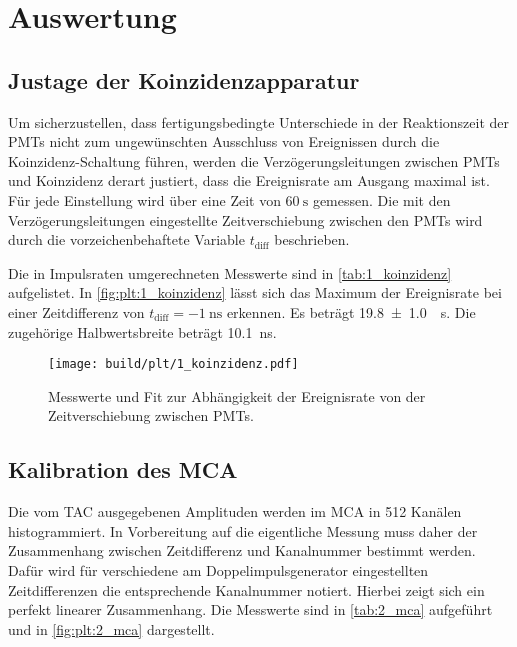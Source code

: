\section{Auswertung}
\label{sec:auswertung}

\FloatBarrier
\subsection{Justage der Koinzidenzapparatur}
Um sicherzustellen,
dass fertigungsbedingte Unterschiede in der Reaktionszeit der \acp{PMT}
nicht zum ungewünschten Ausschluss von Ereignissen durch die Koinzidenz-Schaltung führen,
werden die Verzögerungsleitungen zwischen \acp{PMT} und Koinzidenz derart justiert,
dass die Ereignisrate am Ausgang maximal ist.
Für jede Einstellung wird über eine Zeit von $\SI{60}{\second}$ gemessen.
%
Die mit den Verzögerungsleitungen eingestellte Zeitverschiebung zwischen den \acp{PMT}
wird durch die vorzeichenbehaftete Variable $t_\text{diff}$ beschrieben.

Die in Impulsraten umgerechneten Messwerte sind in \autoref{tab:1_koinzidenz} aufgelistet.
In \autoref{fig:plt:1_koinzidenz} lässt sich das Maximum der Ereignisrate
bei einer Zeitdifferenz von $t_\text{diff} = \SI{-1}{\nano\second}$ erkennen.
Es beträgt \SI{19.8 \pm 1.0}{\per\second}.
Die zugehörige Halbwertsbreite beträgt \SI{10.1}{\nano\second}.

\begin{table}
    \centering
    \caption{Messwerte zur Abhängigkeit der Ereignisrate von der Zeitverschiebung zwischen \acp{PMT}.}
    \label{tab:1_koinzidenz}
\end{table}

\begin{figure}
    \centering
    \texttt{[image: build/plt/1\_koinzidenz.pdf]}
    \caption{Messwerte und Fit zur Abhängigkeit der Ereignisrate von der Zeitverschiebung zwischen \acp{PMT}.}
    \label{fig:plt:1_koinzidenz}
\end{figure}


\FloatBarrier
\subsection{Kalibration des \acs{MCA}}
Die vom \ac{TAC} ausgegebenen Amplituden werden im \ac{MCA} in \num{512} Kanälen histogrammiert.
In Vorbereitung auf die eigentliche Messung muss daher
der Zusammenhang zwischen Zeitdifferenz und Kanalnummer bestimmt werden.
Dafür wird für verschiedene am Doppelimpulsgenerator eingestellten Zeitdifferenzen
die entsprechende Kanalnummer notiert.
Hierbei zeigt sich ein perfekt linearer Zusammenhang.
Die Messwerte sind in \autoref{tab:2_mca} aufgeführt und in \autoref{fig:plt:2_mca} dargestellt.

